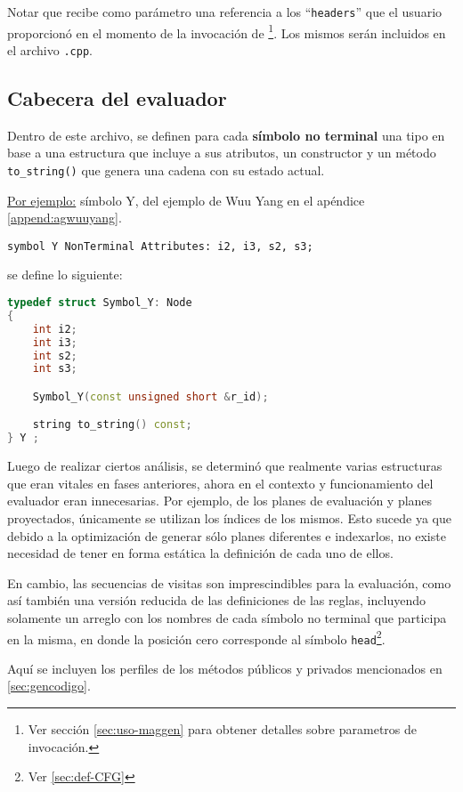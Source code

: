 Notar que recibe como parámetro una referencia a los ``\texttt{headers}'' que el usuario proporcionó en el momento de la invocación de \maggen \footnote{Ver sección \ref{sec:uso-maggen} para obtener detalles sobre parametros de invocación.}. Los mismos serán incluidos en el archivo \texttt{.cpp}.

\subsection{Cabecera del evaluador}

Dentro de este archivo, se definen para cada \textbf{símbolo no terminal} una tipo en base a una estructura que incluye a sus atributos, un constructor y un método \texttt{to\_string()} que genera una cadena con su estado actual.

\underline{Por ejemplo:} símbolo Y, del ejemplo de Wuu Yang en el apéndice \ref{append:agwuuyang}.
\begin{center}\texttt{symbol Y  NonTerminal Attributes: i2, i3, s2, s3;}\end{center}
se define lo siguiente:
\begin{lstlisting}[language=C++, basicstyle=\scriptsize, columns=fullflexible, linewidth=7cm]
typedef struct Symbol_Y: Node
{
    int i2;
    int i3;
    int s2;
    int s3;

    Symbol_Y(const unsigned short &r_id);

    string to_string() const;
} Y ;
\end{lstlisting}

Luego de realizar ciertos análisis, se determinó que realmente varias estructuras que eran vitales en fases anteriores, ahora en el contexto y funcionamiento del evaluador eran innecesarias. Por ejemplo, de los planes de evaluación y planes proyectados, únicamente se utilizan los índices de los mismos. Esto sucede ya que debido a la optimización de generar sólo planes diferentes e indexarlos, no existe necesidad de tener en forma estática la definición de cada uno de ellos.

En cambio, las secuencias de visitas son imprescindibles para la evaluación, como así también una versión reducida de las definiciones de las reglas, incluyendo solamente un arreglo con los nombres de cada símbolo no terminal que participa en la misma, en donde la posición cero corresponde al símbolo \texttt{head}\footnote{Ver \ref{sec:def-CFG}}.

Aquí se incluyen los perfiles de los métodos públicos y privados mencionados en \ref{sec:gencodigo}.

